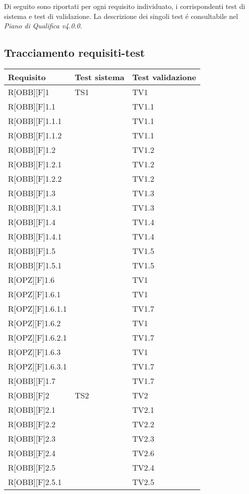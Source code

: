 Di seguito sono riportati per ogni requisito individuato, i corrispondenti test di sistema e test di validazione. La descrizione dei singoli test é consultabile nel \textit{Piano di Qualifica v4.0.0}.
\subsection{Tracciamento requisiti-test}
	\begin{table}[h]
		\begin{tabular}{|p{}|p{}|p{}|}
			\toprule
			
			\textbf{Requisito} & \textbf{Test sistema} & \textbf{Test validazione} \\
			
			\midrule

			R[OBB][F]1 & TS1 & TV1 \\ \midrule
			R[OBB][F]1.1 &  & TV1.1 \\ \midrule
			R[OBB][F]1.1.1 &  & TV1.1 \\ \midrule
			R[OBB][F]1.1.2 &  & TV1.1 \\ \midrule
			R[OBB][F]1.2 &  & TV1.2 \\ \midrule
			R[OBB][F]1.2.1 &  & TV1.2 \\ \midrule
			R[OBB][F]1.2.2 &  & TV1.2 \\ \midrule
			R[OBB][F]1.3 &  & TV1.3 \\ \midrule
			R[OBB][F]1.3.1 &  & TV1.3 \\ \midrule
			R[OBB][F]1.4 &  & TV1.4 \\ \midrule
			R[OBB][F]1.4.1 &  & TV1.4 \\ \midrule
			R[OBB][F]1.5 &  & TV1.5 \\ \midrule
			R[OBB][F]1.5.1 &  & TV1.5 \\ \midrule
			R[OPZ][F]1.6 &  & TV1 \\ \midrule
			R[OPZ][F]1.6.1 &  & TV1 \\ \midrule
			R[OPZ][F]1.6.1.1 &  & TV1.7 \\ \midrule
			R[OPZ][F]1.6.2 &  & TV1 \\ \midrule
			R[OPZ][F]1.6.2.1 &  & TV1.7 \\ \midrule
			R[OPZ][F]1.6.3 &  & TV1 \\ \midrule
			R[OPZ][F]1.6.3.1 &  & TV1.7 \\ \midrule
			R[OBB][F]1.7 &  & TV1.7 \\ \midrule
			R[OBB][F]2 & TS2 & TV2 \\ \midrule
			R[OBB][F]2.1 &  & TV2.1 \\ \midrule
			R[OBB][F]2.2 &  & TV2.2 \\ \midrule
			R[OBB][F]2.3 &  & TV2.3 \\ \midrule
			R[OBB][F]2.4 &  & TV2.6 \\ \midrule
			R[OBB][F]2.5 &  & TV2.4 \\ \midrule
			R[OBB][F]2.5.1 &  & TV2.5 \\ \midrule
	
	\end{tabular}
	\end{table}
	\newpage
	
